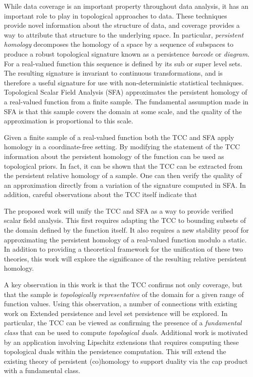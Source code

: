 While data coverage is an important property throughout data analysis, it has an important role to play in topological approaches to data.
These techniques provide novel information about the structure of data, and coverage provides a way to attribute that structure to the underlying space.
In particular, \emph{persistent homology} decomposes the homology of a space by a sequence of subspaces to produce a robust topological signature known as a persistence \emph{barcode} or \emph{diagram}.
For a real-valued function this sequence is defined by its sub or super level sets.
The resulting signature is invariant to continuous transformations, and is therefore a useful signature for use with non-deterministic statistical techniques.
Topological Scalar Field Analysis (SFA) approximates the persistent homology of a real-valued function from a finite sample.
The fundamental assumption made in SFA is that this sample covers the domain at some scale, and the quality of the approximation is proportional to this scale.

Given a finite sample of a real-valued function both the TCC and SFA apply homology in a coordinate-free setting.
By modifying the statement of the TCC information about the persistent homology of the function can be used as topological priors.
In fact, it can be shown that the TCC can be extracted from the persistent relative homology of a sample.
One can then verify the quality of an approximation directly from a variation of the signature computed in SFA.
In addition, careful observations about the TCC itself indicate that

The proposed work will unify the TCC and SFA as a way to provide verified scalar field analysis.
This first requires adapting the TCC to bounding subsets of the domain defined by the function itself.
It also requires a new stability proof for approximating the persistent homology of a real-valued function modulo a static.
In addition to providing a theoretical framework for the unification of these two theories, this work will explore the significance of the resulting relative persistent homology.

A key observation in this work is that the TCC confirms not only coverage, but that the sample is \emph{topologically representative} of the domain for a given range of function values.
Using this observation, a number of connections with existing work on Extended persistence and level set persistence will be explored.
In particular, the TCC can be viewed as confirming the presence of a \emph{fundamental class} that can be used to compute \emph{topological duals}.
Additional work is motivated by an application involving Lipschitz extensions that requires computing these topological duals within the persistence computation.
This will extend the existing theory of persistent (co)homology to support duality via the cap product with a fundamental class.

